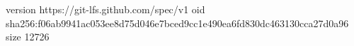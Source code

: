 version https://git-lfs.github.com/spec/v1
oid sha256:f06ab9941ac053ee8d75d046e7bced9cc1e490ea6fd830dc463130cca27d0a96
size 12726
